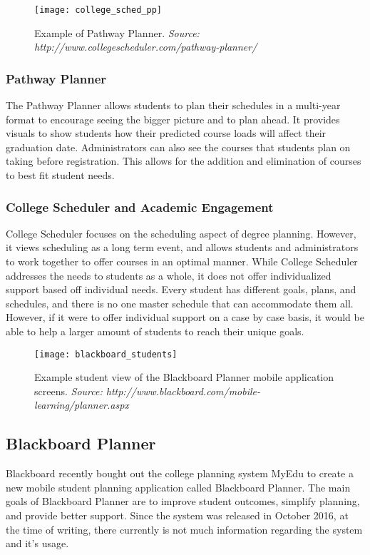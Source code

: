 \begin{figure}[h]
\centering
\texttt{[image: college\_sched\_pp]}
\caption{Example of Pathway Planner. \textit{Source: http://www.collegescheduler.com/pathway-planner/}}
\end{figure}

\subsubsection{Pathway Planner}
The Pathway Planner allows students to plan their schedules in a multi-year format to encourage seeing the bigger picture and to plan ahead. It provides visuals to show students how their predicted course loads will affect their graduation date. Administrators can also see the courses that students plan on taking before registration. This allows for the addition and elimination of courses to best fit student needs. 

\subsubsection{College Scheduler and Academic Engagement}
College Scheduler focuses on the scheduling aspect of degree planning. However, it views scheduling as a long term event, and allows students and administrators to work together to offer courses in an optimal manner. While College Scheduler addresses the needs to students as a whole, it does not offer individualized support based off individual needs. Every student has different goals, plans, and schedules, and there is no one master schedule that can accommodate them all. However, if it were to offer individual support on a case by case basis, it would be able to help a larger amount of students to reach their unique goals. 

\begin{figure}[h]
\centering
\texttt{[image: blackboard\_students]}
\caption{Example student view of the Blackboard Planner mobile application screens. \textit{Source: http://www.blackboard.com/mobile-learning/planner.aspx}}
\end{figure}
\subsection{Blackboard Planner} 
Blackboard recently bought out the college planning system MyEdu to create a new mobile student planning application called Blackboard Planner. The main goals of Blackboard Planner are to improve student outcomes, simplify planning, and provide better support. Since the system was released in October 2016, at the time of writing, there currently is not much information regarding the system and it's usage.

